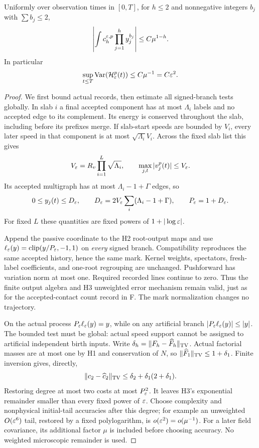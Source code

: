 \begin{lemma}\label{lem:weighted}
Uniformly over observation times in $[0,T]$, for $h\le2$ and nonnegative
integers $b_j$ with $\sum b_j\le2$,
\begin{equation}\label{eq:weighted}
 \left|\int c_h^{\varepsilon,p}\prod_{j=1}^h y_j^{b_j}\right|
                                      \le C\mu^{1-h}.
\end{equation}
In particular
\begin{equation}\label{eq:Hvar}
 \sup_{t\le T}\operatorname{Var}(\mathcal H_\varepsilon^p(t))\le C\mu^{-1}=C\varepsilon^2.
\end{equation}
\end{lemma}
\begin{proof}
We first bound actual records, then estimate all signed-branch tests globally.
In slab $i$ a final accepted component has at most $\Lambda_i$ labels and no
accepted edge to its complement. Its energy is conserved throughout the slab,
including before its prefixes merge. If slab-start speeds are bounded by
$V_i$, every later speed in that component is at most $\sqrt{\Lambda_i}V_i$.
Across the fixed slab list this gives
\[
 V_\varepsilon=R_v\prod_{i=1}^L\sqrt{\Lambda_i},\qquad
 \max_{j,t}|v_j^p(t)|\le V_\varepsilon.
\]
Its accepted multigraph has at most $\Lambda_i-1+\Gamma$ edges, so
\begin{equation}\label{eq:record-clip-scale}
 0\le y_j(t)\le D_\varepsilon,
 \qquad D_\varepsilon=2V_\varepsilon\sum_i(\Lambda_i-1+\Gamma),
 \qquad P_\varepsilon=1+D_\varepsilon.
\end{equation}
For fixed $L$ these quantities are fixed powers of $1+|\log\varepsilon|$.

Append the passive coordinate to the H2 root-output maps and use
$\ell_\varepsilon(y)=\operatorname{clip}(y/P_\varepsilon,-1,1)$ on \emph{every} signed branch.
Compatibility reproduces the same accepted history, hence the same mark.
Kernel weights, spectators, fresh-label coefficients, and one-root regrouping
are unchanged. Pushforward has variation norm at most one. Required recorded
lines continue to zero. Thus the finite output algebra and H3 unweighted
error mechanism remain valid, just as for the accepted-contact count record
in F. The mark normalization changes no trajectory.

On the actual process $P_\varepsilon\ell_\varepsilon(y)=y$, while on any artificial branch
$|P_\varepsilon\ell_\varepsilon(y)|\le|y|$. The bounded test must be global: actual speed
support cannot be assigned to artificial independent birth inputs.
Write $\delta_h=\|F_h-\widehat F_h\|_{\mathrm{TV}}$.
Actual factorial masses are at most one by H1 and conservation of $N$, so
$\|\widehat F_1\|_{\mathrm{TV}}\le1+\delta_1$. Finite inversion gives, directly,
\[
 \|c_2-\widehat c_2\|_{\mathrm{TV}}
             \le\delta_2+\delta_1(2+\delta_1).
\]
Restoring degree at most two costs at most $P_\varepsilon^2$. It leaves H3's
exponential remainder smaller than every fixed power of $\varepsilon$.
Choose complexity and nonphysical initial-tail accuracies after this degree;
for example an unweighted $O(\varepsilon^6)$ tail, restored by a fixed polylogarithm,
is $o(\varepsilon^2)=o(\mu^{-1})$. For a later field covariance, its additional
factor $\mu$ is included before choosing accuracy. No weighted microscopic
remainder is used.


\end{proof}
